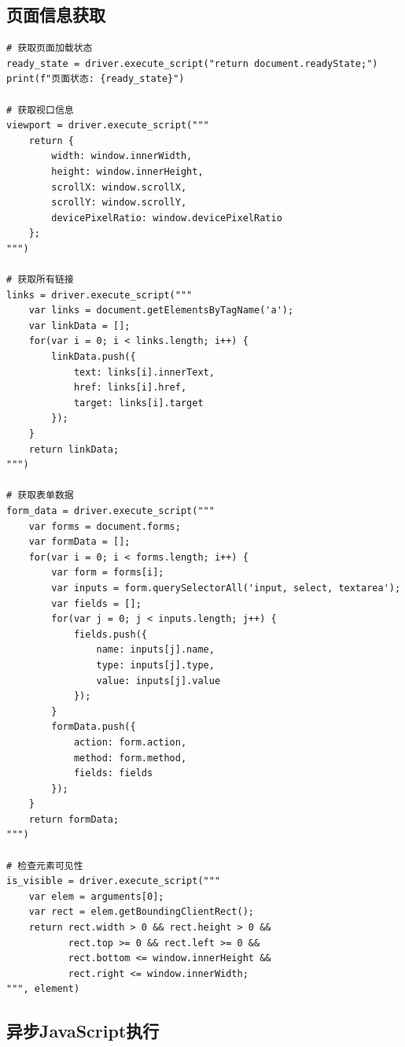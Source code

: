 \subsection{页面信息获取}

\begin{lstlisting}[style=demostyle,numbers=none]
# 获取页面加载状态
ready_state = driver.execute_script("return document.readyState;")
print(f"页面状态: {ready_state}")

# 获取视口信息
viewport = driver.execute_script("""
    return {
        width: window.innerWidth,
        height: window.innerHeight,
        scrollX: window.scrollX,
        scrollY: window.scrollY,
        devicePixelRatio: window.devicePixelRatio
    };
""")

# 获取所有链接
links = driver.execute_script("""
    var links = document.getElementsByTagName('a');
    var linkData = [];
    for(var i = 0; i < links.length; i++) {
        linkData.push({
            text: links[i].innerText,
            href: links[i].href,
            target: links[i].target
        });
    }
    return linkData;
""")

# 获取表单数据
form_data = driver.execute_script("""
    var forms = document.forms;
    var formData = [];
    for(var i = 0; i < forms.length; i++) {
        var form = forms[i];
        var inputs = form.querySelectorAll('input, select, textarea');
        var fields = [];
        for(var j = 0; j < inputs.length; j++) {
            fields.push({
                name: inputs[j].name,
                type: inputs[j].type,
                value: inputs[j].value
            });
        }
        formData.push({
            action: form.action,
            method: form.method,
            fields: fields
        });
    }
    return formData;
""")

# 检查元素可见性
is_visible = driver.execute_script("""
    var elem = arguments[0];
    var rect = elem.getBoundingClientRect();
    return rect.width > 0 && rect.height > 0 && 
           rect.top >= 0 && rect.left >= 0 &&
           rect.bottom <= window.innerHeight &&
           rect.right <= window.innerWidth;
""", element)
\end{lstlisting}

\subsection{异步JavaScript执行}

